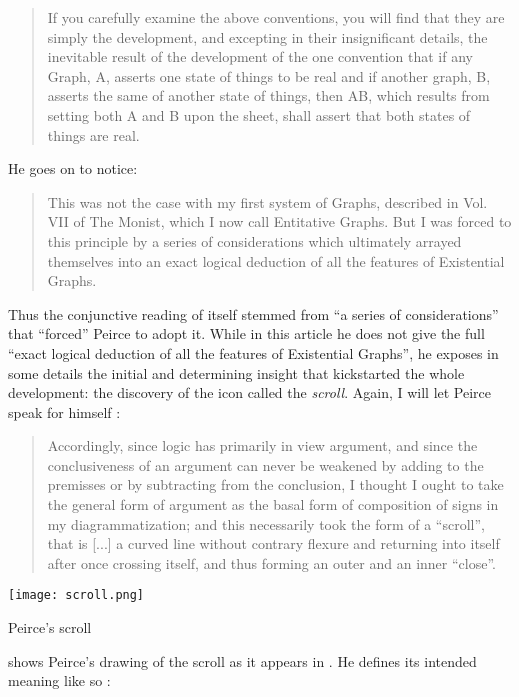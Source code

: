 \begin{quote}
If you carefully examine the above conventions, you will find that they are
simply the development, and excepting in their insignificant details, the
inevitable result of the development of the one convention that if any Graph, A,
asserts one state of things to be real and if another graph, B, asserts the same
of another state of things, then AB, which results from setting both A and B
upon the sheet, shall assert that both states of things are real.
\end{quote}

He goes on to notice:

\begin{quote}
   This was not the case with my first system of Graphs, described in Vol. VII
of The Monist, which I now call Entitative Graphs. But I was forced to this
principle by a series of considerations which ultimately arrayed themselves into
an exact logical deduction of all the features of Existential Graphs.
\end{quote}

Thus the conjunctive reading of  itself stemmed from ``a series of
considerations'' that ``forced'' Peirce to adopt it. While in this article he
does not give the full ``exact logical deduction of all the features of
Existential Graphs'', he exposes in some details the initial and determining
insight that kickstarted the whole development: the discovery of the icon called
the \emph{scroll}. Again, I will let Peirce speak for
himself \cite[pp.~533--534]{peirce_prolegomena_1906}:

\begin{quote}
  Accordingly, since logic has primarily in view argument, and since the
conclusiveness of an argument can never be weakened by adding to the premisses
or by subtracting from the conclusion, I thought I ought to take the general
form of argument as the basal form of composition of signs in my
diagrammatization; and this necessarily took the form of a ``scroll'', that is
[...] a curved line without contrary flexure and returning into itself after
once crossing itself, and thus forming an outer and an inner ``close''.
\end{quote}

\begin{marginfigure}
  \texttt{[image: scroll.png]}
  \caption{Peirce's scroll}
\end{marginfigure}

 shows Peirce's drawing of the scroll as it appears in
\cite[Fig.~5]{peirce_prolegomena_1906}. He defines its intended meaning like so
\cite[p.~534--535]{peirce_prolegomena_1906}:

